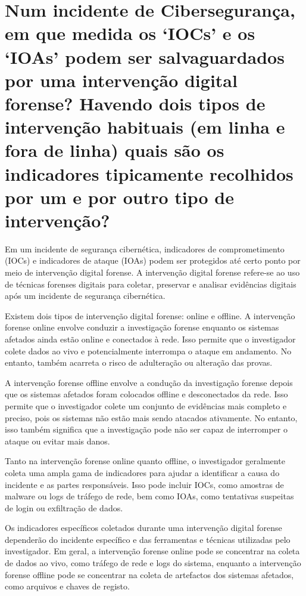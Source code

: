 \section[Pergunta 4]{Num incidente de Cibersegurança, em que medida os `IOCs' e os `IOAs' podem ser salvaguardados por uma intervenção digital forense? Havendo dois tipos de intervenção habituais (em linha e fora de linha) quais são os indicadores tipicamente recolhidos por um e por outro tipo de intervenção?}

Em um incidente de segurança cibernética, indicadores de comprometimento (IOCs) e indicadores de ataque (IOAs) podem ser protegidos até certo ponto por meio de intervenção digital forense. A intervenção digital forense refere-se ao uso de técnicas forenses digitais para coletar, preservar e analisar evidências digitais após um incidente de segurança cibernética.

Existem dois tipos de intervenção digital forense: online e offline. A intervenção forense online envolve conduzir a investigação forense enquanto os sistemas afetados ainda estão online e conectados à rede. Isso permite que o investigador colete dados ao vivo e potencialmente interrompa o ataque em andamento. No entanto, também acarreta o risco de adulteração ou alteração das provas.

A intervenção forense offline envolve a condução da investigação forense depois que os sistemas afetados foram colocados offline e desconectados da rede. Isso permite que o investigador colete um conjunto de evidências mais completo e preciso, pois os sistemas não estão mais sendo atacados ativamente. No entanto, isso também significa que a investigação pode não ser capaz de interromper o ataque ou evitar mais danos.

Tanto na intervenção forense online quanto offline, o investigador geralmente coleta uma ampla gama de indicadores para ajudar a identificar a causa do incidente e as partes responsáveis. Isso pode incluir IOCs, como amostras de malware ou logs de tráfego de rede, bem como IOAs, como tentativas suspeitas de login ou exfiltração de dados.

Os indicadores específicos coletados durante uma intervenção digital forense dependerão do incidente específico e das ferramentas e técnicas utilizadas pelo investigador. Em geral, a intervenção forense online pode se concentrar na coleta de dados ao vivo, como tráfego de rede e logs do sistema, enquanto a intervenção forense offline pode se concentrar na coleta de artefactos dos sistemas afetados, como arquivos e chaves de registo.

